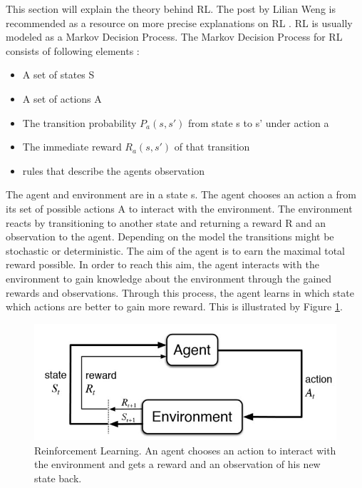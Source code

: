\vspace{0.5cm}

This section will explain the theory behind RL. The post by Lilian Weng is recommended as a resource on more precise explanations on RL \cite{rllilianweng}. RL is usually modeled as a Markov Decision Process. The Markov Decision Process for RL consists of following elements \cite{rlwiki}:

\begin{itemize}
	\item A set of states S
	\item A set of actions A
	\item The transition probability $P_a(s,s')$ from state s to s' under action a
	\item The immediate reward $R_a(s,s')$ of that transition
	\item rules that describe the agents observation
\end{itemize}

The agent and environment are in a state s. The agent chooses an action a from its set of possible actions A to interact with the environment. The environment reacts by transitioning to another state and returning a reward R and an observation to the agent. Depending on the model the transitions might be stochastic or deterministic. The aim of the agent is to earn the maximal total reward possible. In order to reach this aim, the agent interacts with the environment to gain knowledge about the environment through the gained rewards and observations. Through this process, the agent learns in which state which actions are better to gain more reward. This is illustrated by Figure \ref{rl_general}.

\begin{figure} [h]
	
	\centering
	\includegraphics[width=1\textwidth]{figures/rl_general.jpg}
	\caption{Reinforcement Learning. An agent chooses an action to interact with the environment and gets a reward and an observation of his new state back. 
		\label{rl_general}	
		\cite{rl_general.jpg}
	}
\end{figure}

